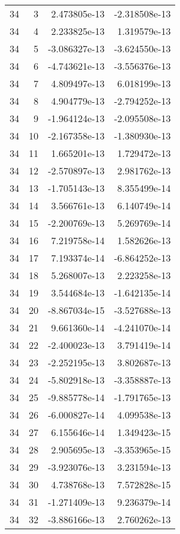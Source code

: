\begin{tabular}{rrrr}
  34 &    3 &  2.473805e-13 & -2.318508e-13 \\
  34 &    4 &  2.233825e-13 &  1.319579e-13 \\
  34 &    5 & -3.086327e-13 & -3.624550e-13 \\
  34 &    6 & -4.743621e-13 & -3.556376e-13 \\
  34 &    7 &  4.809497e-13 &  6.018199e-13 \\
  34 &    8 &  4.904779e-13 & -2.794252e-13 \\
  34 &    9 & -1.964124e-13 & -2.095508e-13 \\
  34 &   10 & -2.167358e-13 & -1.380930e-13 \\
  34 &   11 &  1.665201e-13 &  1.729472e-13 \\
  34 &   12 & -2.570897e-13 &  2.981762e-13 \\
  34 &   13 & -1.705143e-13 &  8.355499e-14 \\
  34 &   14 &  3.566761e-13 &  6.140749e-14 \\
  34 &   15 & -2.200769e-13 &  5.269769e-14 \\
  34 &   16 &  7.219758e-14 &  1.582626e-13 \\
  34 &   17 &  7.193374e-14 & -6.864252e-13 \\
  34 &   18 &  5.268007e-13 &  2.223258e-13 \\
  34 &   19 &  3.544684e-13 & -1.642135e-14 \\
  34 &   20 & -8.867034e-15 & -3.527688e-13 \\
  34 &   21 &  9.661360e-14 & -4.241070e-14 \\
  34 &   22 & -2.400023e-13 &  3.791419e-14 \\
  34 &   23 & -2.252195e-13 &  3.802687e-13 \\
  34 &   24 & -5.802918e-13 & -3.358887e-13 \\
  34 &   25 & -9.885778e-14 & -1.791765e-13 \\
  34 &   26 & -6.000827e-14 &  4.099538e-13 \\
  34 &   27 &  6.155646e-14 &  1.349423e-15 \\
  34 &   28 &  2.905695e-13 & -3.353965e-15 \\
  34 &   29 & -3.923076e-13 &  3.231594e-13 \\
  34 &   30 &  4.738768e-13 &  7.572828e-15 \\
  34 &   31 & -1.271409e-13 &  9.236379e-14 \\
  34 &   32 & -3.886166e-13 &  2.760262e-13 \\

\end{tabular}
